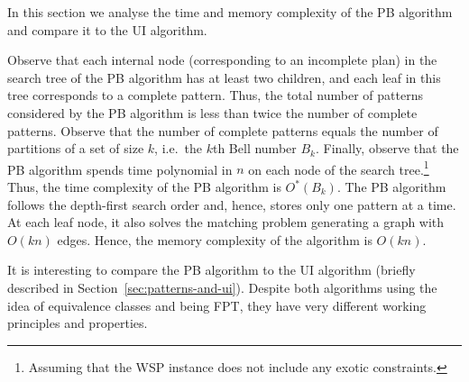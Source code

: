 \documentclass[runningheads,proof]{llncs}
\begin{document}
In this section we analyse the time and memory complexity of the PB algorithm and compare it to the UI algorithm.
 


Observe that each internal node (corresponding to an incomplete plan) in the search tree of the PB algorithm has at least two children, and each leaf in this tree corresponds to a complete pattern.
Thus, the total number of patterns considered by the PB algorithm is less than twice the number of complete patterns. 
Observe that the number of complete patterns equals the number of partitions of a set of size $k$, i.e.\ the $k$th Bell number $B_k$. 
Finally, observe that the PB algorithm spends time polynomial in $n$ on each node of the search tree.\footnote{Assuming that the WSP instance does not include any exotic constraints.}
Thus, the time complexity of the PB algorithm is $O^*(B_k)$.
The PB algorithm follows the depth-first search order and, hence, stores only one pattern at a time.  
At each leaf node, it also solves the matching problem generating a graph with $O(kn)$ edges.  
Hence, the memory complexity of the algorithm is $O(kn)$.

It is interesting to compare the PB algorithm to the UI algorithm (briefly described in Section~\ref{sec:patterns-and-ui}).
Despite both algorithms using the idea of equivalence classes and being FPT, they have very different working principles and properties.
\end{document}

